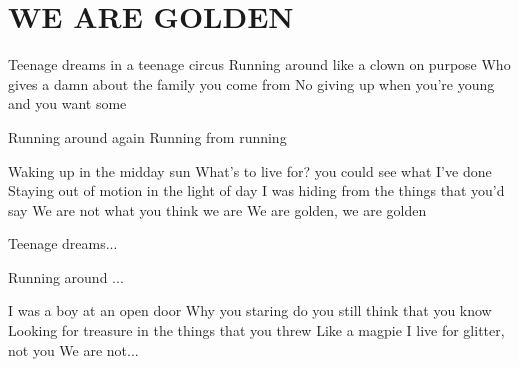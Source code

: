 \documentclass[../../../songbook.tex]{subfiles}
\begin{document}
\TabPositions{9cm} %
\section*{WE ARE GOLDEN}
{}
\vspace{0.5cm}
\-\hspace{1cm} Teenage dreams in a teenage circus		  \newline
\-\hspace{1cm} Running around like a clown on purpose			 \newline
\-\hspace{1cm} Who gives a damn about the family you come from			 \newline
\-\hspace{1cm} No giving up when you’re young and you want some			 \newline

Running around again    	 \newline
Running from running   			 \newline

Waking up in the midday sun			  \newline
What’s to live for?  you could see what I’ve done			 \newline
Staying out of motion in the light of day			 \newline
I was hiding from the things that you’d say			 \newline
We are not what you think we are	 \newline
We are golden, we are golden     			 \newline        

\-\hspace{1cm} Teenage dreams...			 \newline

Running around ...			 \newline

I was a boy at an open door			    \newline
Why you staring do you still think that you know			 \newline
Looking for treasure in the things that you threw			 \newline
Like a magpie I live for glitter, not you			 \newline
We are not...   			 \newline
\end{document}
